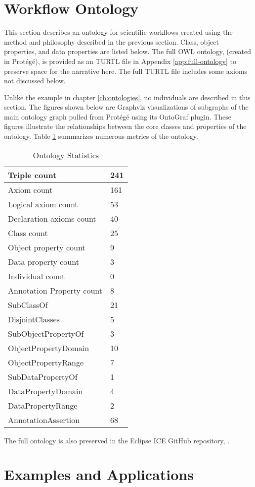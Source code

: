 \section{Workflow Ontology}
\label{workflow-ont-section}

This section describes an ontology for scientific workflows created using the
method and philosophy described in the previous section. Class, object
properties, and data properties are listed below. The full OWL ontology,
(created in Prot\'eg\'e), is provided as an TURTL file in Appendix
\ref{app:full-ontology} to preserve space for the narrative here. The full
TURTL file includes some axioms not discussed below. 

Unlike the example in chapter \ref{ch:ontologies}, no individuals are described
in this section. The figures shown below are Graphviz visualizations of
subgraphs of the main ontology graph pulled from Prot\'eg\'e using its OntoGraf
plugin. These figures illustrate the relationships between the core classes and
properties of the ontology. Table \ref{ont-stats-table} summarizes numerous
metrics of the ontology.

\begin{table}[H]
\begin{tabularx}{\textwidth}{|X|X|}
\hline
Triple count & 241 \tabularnewline\hline
Axiom count	& 161	\tabularnewline\hline
Logical axiom count	& 53	\tabularnewline\hline
Declaration axioms count &	40	\tabularnewline\hline
Class count	& 25	\tabularnewline\hline
Object property count	& 9	\tabularnewline\hline
Data property count	& 3	\tabularnewline\hline
Individual count &	0	\tabularnewline\hline
Annotation Property count	& 8 \tabularnewline\hline
SubClassOf	& 21		\tabularnewline\hline
DisjointClasses  &	5 \tabularnewline\hline
SubObjectPropertyOf	& 3 \tabularnewline\hline
ObjectPropertyDomain &	10	\tabularnewline\hline
ObjectPropertyRange	& 7 \tabularnewline\hline
SubDataPropertyOf	& 1 \tabularnewline\hline
DataPropertyDomain	& 4	\tabularnewline\hline
DataPropertyRange &	2 \tabularnewline\hline
AnnotationAssertion	& 68 \tabularnewline\hline
\end{tabularx}
\caption{Ontology Statistics}
\label{ont-stats-table}
\end{table}

The full ontology is also preserved in the Eclipse ICE GitHub repository,
\cite{eclipse-ice-github}.


\section{Examples and Applications}

